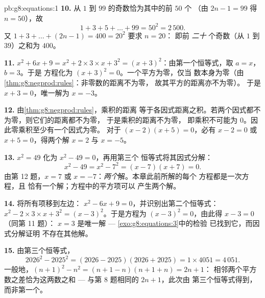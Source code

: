 \begin{solution}{pb:g8:equations:1}
\textbf{10.} 从 $1$ 到 $99$ 的奇数恰为其中的前 $50$ 个
（由 $2n - 1 = 99$ 得 $n = 50$），故
\[
1 + 3 + 5 + \dots + 99 = 50^2 = 2\,500 .
\]
又 $1 + 3 + \dots + (2n - 1) = 400 = 20^2$ 要求 $n = 20$：
即前 \emph{二十} 个奇数（从 $1$ 到 $39$）之和为
$400$。

\textbf{11.} $x^2 + 6x + 9 = x^2 + 2 \times 3 \times x + 3^2 =
(x + 3)^2$：由第一个恒等式，取 $a = x$，$b = 3$。于是
方程化为 $(x + 3)^2 = 0$。一个平方为零，仅当
数本身为零（由\cref{thm:g8:negprod:rules}：非零数的距离不为零，
故其平方的距离亦不为零）。
于是 $x + 3 = 0$，唯一解为 $x = -3$。

\textbf{12.} 由\cref{thm:g8:negprod:rules}，乘积的距离
等于各因式距离之积。若两个因式都不为零，则它们的距离都不为零，
于是乘积的距离不为零，
即乘积不可能为 $0$。因此零乘积至少有一个因式为零。
对于 $(x - 2)(x + 5) = 0$，必有
$x - 2 = 0$ 或 $x + 5 = 0$，得两个解 $x = 2$ 与
$x = -5$。

\textbf{13.} $x^2 = 49$ 化为 $x^2 - 49 = 0$，再用第三个
恒等式将其因式分解：
\[
x^2 - 49 = x^2 - 7^2 = (x - 7)(x + 7) = 0 .
\]
由第 12 题，$x = 7$ 或 $x = -7$：\emph{两个}解。本章此前所解的每个
方程都是一次方程，且
恰有一个解；方程中的平方项可以
产生两个解。

\textbf{14.} 将所有项移到左边：
$x^2 - 6x + 9 = 0$，并识别出第二个恒等式：
$x^2 - 2 \times 3 \times x + 3^2 = (x - 3)^2$。于是方程为
$(x - 3)^2 = 0$，由此得 $x - 3 = 0$（同第 11 题）：
$x = 3$ 是唯一解 --- \cref{exo:g8:equations:3}中的检验
已找到它，而因式分解证明
不存在其他解。

\textbf{15.} 由第三个恒等式，
\[
2026^2 - 2025^2 = (2026 - 2025)(2026 + 2025)
= 1 \times 4051 = 4\,051 .
\]
一般地，$(n+1)^2 - n^2 = (n + 1 - n)(n + 1 + n) = 2n + 1$：
相邻两个平方数之差恰为这两数之和 ---
与第 8 题相同的 $2n + 1$，此次由
第三个恒等式得到，而非第一个。
\end{solution}

